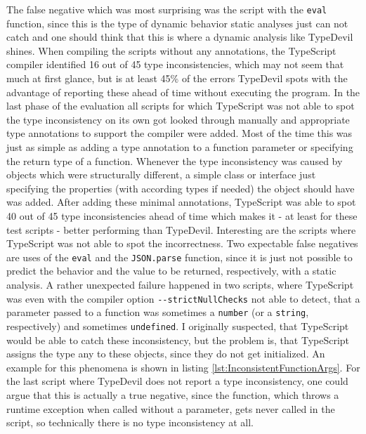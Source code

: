 \documentclass[runningheads,a4paper]{llncs}
\begin{document}
\newpage
The false negative which was most surprising was the script with the \lstinline[columns=fixed]{eval} function, since this is the type of dynamic behavior static analyses just can not catch and one should think that this is where a dynamic analysis like TypeDevil shines.
When compiling the scripts without any annotations, the TypeScript compiler identified 16 out of 45 type inconsistencies, which may not seem that much at first glance, but is at least 45\% of the errors TypeDevil spots with the advantage of reporting these ahead of time without executing the program.
In the last phase of the evaluation all scripts for which TypeScript was not able to spot the type inconsistency on its own got looked through manually and appropriate type annotations to support the compiler were added.
Most of the time this was just as simple as adding a type annotation to a function parameter or specifying the return type of a function.
Whenever the type inconsistency was caused by objects which were structurally different, a simple class or interface just specifying the properties (with according types if needed) the object should have was added.
After adding these minimal annotations, TypeScript was able to spot 40 out of 45 type inconsistencies ahead of time which makes it - at least for these test scripts - better performing than TypeDevil.
Interesting are the scripts where TypeScript was not able to spot the incorrectness.
Two expectable false negatives are uses of the \lstinline[columns=fixed]{eval} and the \lstinline[columns=fixed]{JSON.parse} function, since it is just not possible to predict the behavior and the value to be returned, respectively, with a static analysis.
A rather unexpected failure happened in two scripts, where TypeScript was even with the compiler option \lstinline[columns=fixed]{--strictNullChecks} not able to detect, that a parameter passed to a function was sometimes a \lstinline[columns=fixed]{number} (or a \lstinline[columns=fixed]{string}, respectively) and sometimes \lstinline[columns=fixed]{undefined}.
I originally suspected, that TypeScript would be able to catch these inconsistency, but the problem is, that TypeScript assigns the type any to these objects, since they do not get initialized.
An example for this phenomena is shown in listing \ref{lst:InconsistentFunctionArgs}.
For the last script where TypeDevil does not report a type inconsistency, one could argue that this is actually a true negative, since the function, which throws a runtime exception when called without a parameter, gets never called in the script, so technically there is no type inconsistency at all.\\
\end{document}
